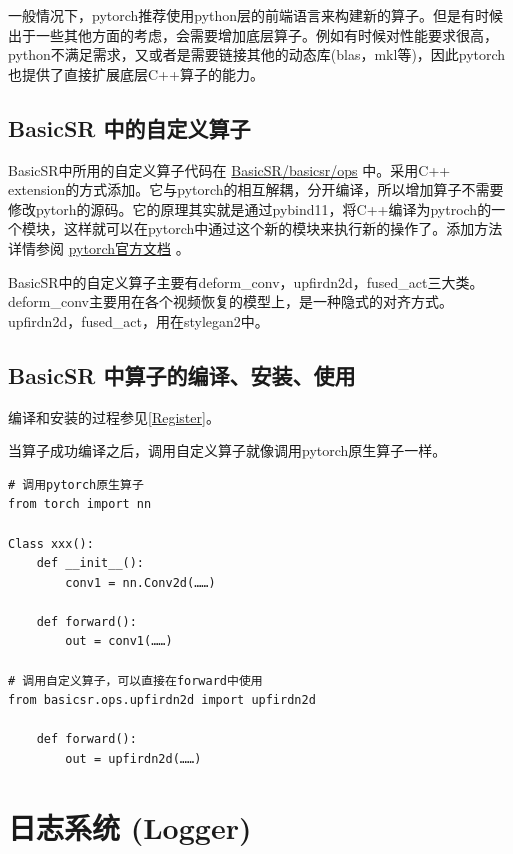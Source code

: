 \documentclass[../main.tex]{subfiles}
\begin{document}
一般情况下，pytorch推荐使用python层的前端语言来构建新的算子。但是有时候出于一些其他方面的考虑，会需要增加底层算子。例如有时候对性能要求很高，python不满足需求，又或者是需要链接其他的动态库(blas，mkl等)，因此pytorch也提供了直接扩展底层C++算子的能力。

\subsection{BasicSR 中的自定义算子}

BasicSR中所用的自定义算子代码在 \href{https://github.com/XPixelGroup/BasicSR/tree/master/basicsr/ops}{BasicSR/basicsr/ops} 中。采用C++ extension的方式添加。它与pytorch的相互解耦，分开编译，所以增加算子不需要修改pytorh的源码。它的原理其实就是通过pybind11，将C++编译为pytroch的一个模块，这样就可以在pytorch中通过这个新的模块来执行新的操作了。添加方法详情参阅 \href{https://pytorch.org/tutorials/advanced/cpp_extension.html#writing-a-mixed-c-cuda-extension}{pytorch官方文档} 。

BasicSR中的自定义算子主要有deform\_conv，upfirdn2d，fused\_act三大类。deform\_conv主要用在各个视频恢复的模型上，是一种隐式的对齐方式。upfirdn2d，fused\_act，用在stylegan2中。

\subsection{BasicSR 中算子的编译、安装、使用}

\begin{note} %
	编译和安装的过程参见\ref{Register}。
\end{note}

当算子成功编译之后，调用自定义算子就像调用pytorch原生算子一样。


\begin{verbatim}
# 调用pytorch原生算子
from torch import nn

Class xxx():
    def __init__():
        conv1 = nn.Conv2d(……)

    def forward():
        out = conv1(……)

# 调用自定义算子，可以直接在forward中使用
from basicsr.ops.upfirdn2d import upfirdn2d
    
    def forward():
        out = upfirdn2d(……)

\end{verbatim}


\section{日志系统 (Logger)}
\end{document}
